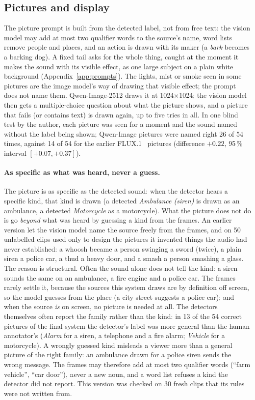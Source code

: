 \subsection{Pictures and display}\label{sec:pictures}
The picture prompt is built from the detected label, not from free text: the vision model may add at most two
qualifier words to the source's name, word lists remove people and places, and an action is drawn with its maker (a
\emph{bark} becomes a barking dog). A fixed tail asks for the whole thing, caught at the moment it makes the sound with its visible effect, as one large
subject on a plain white background (Appendix~\ref{app:prompts}). The lights, mist or smoke seen in some pictures are
the image model's way of drawing that visible effect; the prompt does not name them. Qwen-Image-2512
draws it at 1024$\times$1024; the vision model then gets a multiple-choice question about what the picture shows, and
a picture that fails (or contains text) is drawn again, up to five tries in all. In one blind test by the author, each picture was seen for a
moment and the sound named without the label being shown; Qwen-Image pictures were named right 26 of 54 times,
against 14 of 54 for the earlier FLUX.1~\cite{fluxcard} pictures (difference $+0.22$, 95\,\% interval $[+0.07, +0.37]$).

\paragraph{As specific as what was heard, never a guess.} The picture is as specific as the detected sound: when the
detector hears a specific kind, that kind is drawn (a detected \emph{Ambulance (siren)} is drawn as an ambulance, a
detected \emph{Motorcycle} as a motorcycle). What the picture does not do is go \emph{beyond} what was heard by guessing a kind
from the frames. An earlier version let the vision model name the source freely from the frames, and on 50 unlabelled
clips used only to design the pictures it invented things the audio had never established: a whoosh became a person
swinging a sword (twice), a plain siren a police car, a thud a heavy door, and a smash a person smashing a glass. The
reason is structural. Often the sound alone does not tell the kind: a siren sounds the same on an ambulance, a fire
engine and a police car. The frames rarely settle it, because the sources this system draws are by definition off
screen, so the model guesses from the place (a city street suggests a police car); and when the source \emph{is} on
screen, no picture is needed at all. The detectors themselves often report the family rather than the kind: in 13 of
the 54 correct pictures of the final system the detector's label was more general than the human annotator's
(\emph{Alarm} for a siren, a telephone and a fire alarm; \emph{Vehicle} for a motorcycle). A wrongly guessed kind
misleads a viewer more than a general picture of the right family: an ambulance drawn for a police siren sends the
wrong message. The frames may therefore add at most two qualifier words (``farm vehicle'', ``car door''), never a new
noun, and a word list refuses a kind the detector did not report. This version was checked on 30 fresh clips that its
rules were not written from.


